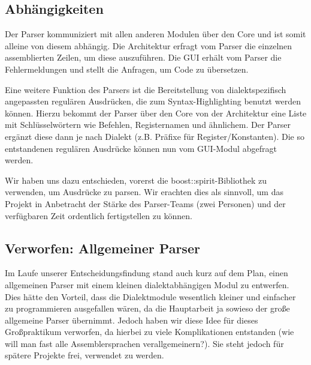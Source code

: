 \documentclass[a4paper]{article}
\begin{document}
\subsection{Abhängigkeiten}
Der Parser kommuniziert mit allen anderen Modulen über den Core und ist somit alleine von diesem abhängig. 
Die Architektur erfragt vom Parser die einzelnen assemblierten Zeilen, um diese auszuführen.
Die GUI erhält vom Parser die Fehlermeldungen und stellt die Anfragen, um Code zu übersetzen.

Eine weitere Funktion des Parsers ist die Bereitstellung von dialektspezifisch angepassten regulären Ausdrücken, die zum Syntax-Highlighting benutzt werden können.
Hierzu bekommt der Parser über den Core von der Architektur eine Liste mit Schlüsselwörtern wie Befehlen, Registernamen und ähnlichem. Der Parser ergänzt diese dann je nach Dialekt (z.B. Präfixe für Register/Konstanten).
Die so entstandenen regulären Ausdrücke können nun vom GUI-Modul abgefragt werden.

Wir haben uns dazu entschieden, vorerst die boost::spirit-Bibliothek zu verwenden, um Ausdrücke zu parsen.
Wir erachten dies als sinnvoll, um das Projekt in Anbetracht der Stärke des Parser-Teams (zwei Personen) und der verfügbaren Zeit ordentlich fertigstellen zu können.
\subsection{Verworfen: Allgemeiner Parser}
Im Laufe unserer Entscheidungsfindung stand auch kurz auf dem Plan, einen allgemeinen Parser mit einem kleinen dialektabhängigen Modul zu entwerfen.
Dies hätte den Vorteil, dass die Dialektmodule wesentlich kleiner und einfacher zu programmieren ausgefallen wären, da die Hauptarbeit ja sowieso der große allgemeine Parser übernimmt.
Jedoch haben wir diese Idee für dieses Großpraktikum verworfen, da hierbei zu viele Komplikationen entstanden (wie will man fast alle Assemblersprachen verallgemeinern?).
Sie steht jedoch für spätere Projekte frei, verwendet zu werden.
\end{document}

